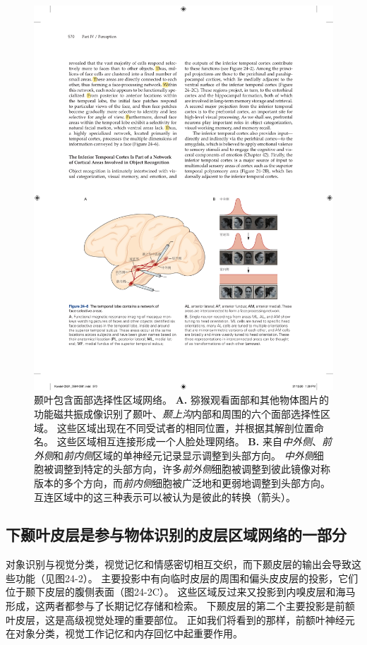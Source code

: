 \begin{figure}[htbp]
	\centering
	\includegraphics[width=0.9\linewidth]{chap24/fig_24_6}
	\caption{颞叶包含面部选择性区域网络。
		\textbf{A.} 猕猴观看面部和其他物体图片的功能磁共振成像识别了颞叶、\textit{颞上沟}内部和周围的六个面部选择性区域。
		这些区域出现在不同受试者的相同位置，并根据其解剖位置命名。
		这些区域相互连接形成一个人脸处理网络。
		\textbf{B.} 来自\textit{中外侧}、\textit{前外侧}和\textit{前内侧}区域的单神经元记录显示调整到头部方向。
		\textit{中外侧}细胞被调整到特定的头部方向，许多\textit{前外侧}细胞被调整到彼此镜像对称版本的多个方向，而\textit{前内侧}细胞被广泛地和更弱地调整到头部方向。
		互连区域中的这三种表示可以被认为是彼此的转换（箭头）。}
	\label{fig:24_6}
\end{figure}



\subsection{下颞叶皮层是参与物体识别的皮层区域网络的一部分}

对象识别与视觉分类，视觉记忆和情感密切相互交织，而下颞皮层的输出会导致这些功能（见图24-2）。
主要投影中有向临时皮层的周围和偏头皮皮层的投影，它们位于颞下皮层的腹侧表面（图24-2C）。
这些区域反过来又投影到内嗅皮层和海马形成，这两者都参与了长期记忆存储和检索。
下颞皮层的第二个主要投影是前额叶皮层，这是高级视觉处理的重要部位。
正如我们将看到的那样，前额叶神经元在对象分类，视觉工作记忆和内存回忆中起重要作用。


